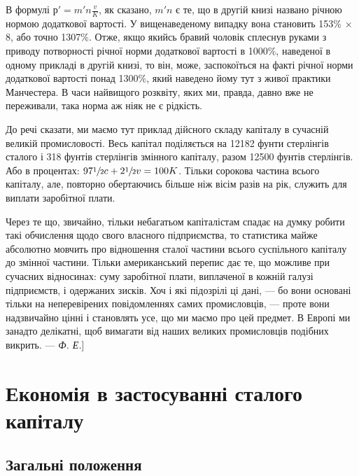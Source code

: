 
В формулі $р' = m'n \frac{v}{K}$, як сказано, $m'n$ є те, що в другій
книзі названо річною нормою додаткової вартості. У вищенаведеному
випадку вона становить 153\% × 8, або точно
1307\%. Отже, якщо якийсь бравий чоловік сплеснув руками
з приводу потворності річної норми додаткової вартості в 1000\%,
наведеної в одному прикладі в другій книзі, то він, може, заспокоїться
на факті річної норми додаткової вартості понад
1300\%, який наведено йому тут з живої практики Манчестера.
В часи найвищого розквіту, яких ми, правда, давно вже не переживали,
така норма аж ніяк не є рідкість.

До речі сказати, ми маємо тут приклад дійсного складу капіталу
в сучасній великій промисловості. Весь капітал поділяється на
\num{12182} фунти стерлінгів сталого і 318 фунтів стерлінгів змінного
капіталу, разом \num{12500} фунтів стерлінгів. Або в процентах:
$97\sfrac{1}{2}c+ 2\sfrac{1}{2}v = 100K$. Тільки сорокова частина всього капіталу,
але, повторно обертаючись більше ніж вісім разів на рік, служить
для виплати заробітної плати.

Через те що, звичайно, тільки небагатьом капіталістам спадає
на думку робити такі обчислення щодо свого власного підприємства,
то статистика майже абсолютно мовчить про відношення
сталої частини всього суспільного капіталу до змінної
частини. Тільки американський перепис дає те, що можливе при
сучасних відносинах: суму заробітної плати, виплаченої в кожній
галузі підприємств, і одержаних зисків. Хоч і які підозрілі ці
дані, — бо вони основані тільки на неперевірених повідомленнях
самих промисловців, — проте вони надзвичайно цінні і становлять
усе, що ми маємо про цей предмет. В Европі ми занадто делікатні,
щоб вимагати від наших великих промисловців подібних
викрить. — \emph{Ф. Е.}]

\section{Економія в застосуванні сталого капіталу}

\subsection{Загальні положення}

